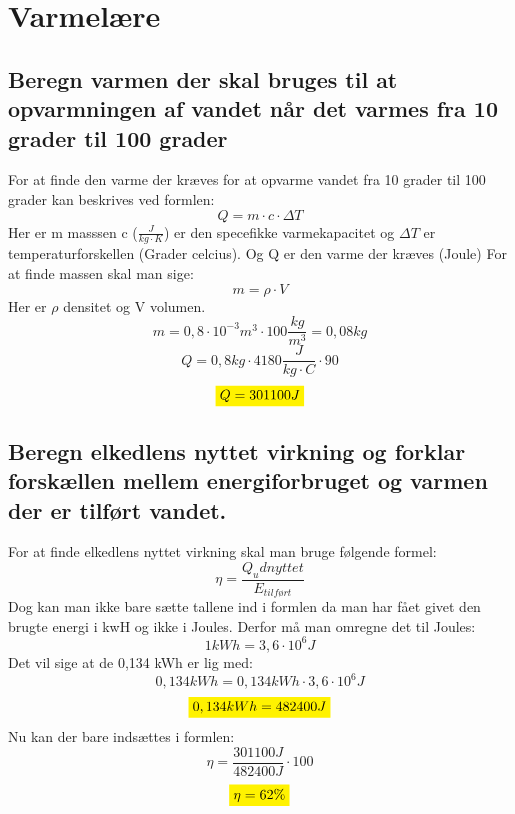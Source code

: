\section{Varmelære}
\subsection{Beregn varmen der skal bruges til at opvarmningen af vandet når det varmes fra 10 grader til 100 grader}
For at finde den varme der kræves for at opvarme vandet fra 10 grader til 100 grader kan beskrives ved formlen: 
\begin{equation*}
    Q=m \cdot c \cdot \Delta T
\end{equation*}
Her er m masssen c (\begin{math}
    \frac{J}{kg \cdot K}
\end{math}) er den specefikke varmekapacitet og $\Delta T$ er temperaturforskellen (Grader celcius). Og Q er den varme der kræves (Joule)
For at finde massen skal man sige: 
\begin{equation*}
    m=\rho \cdot V
\end{equation*}
Her er $\rho$ densitet og V volumen.
\begin{equation*}
    m=0,8 \cdot 10^{-3} m^3  \cdot 100 \frac{kg}{m^3}=0,08 kg
\end{equation*}
\begin{equation*}
    Q=0,8 kg \cdot 4180 \frac{J}{kg \cdot C} \cdot 90
\end{equation*}
\begin{equation*}
    \mathcolorbox{yellow}{Q=301100 J}
\end{equation*}
\subsection{Beregn elkedlens nyttet virkning og forklar forskællen mellem energiforbruget og varmen der er tilført vandet.}
For at finde elkedlens nyttet virkning skal man bruge følgende formel: 
\begin{equation*}
    \eta=\frac{Q_udnyttet}{E_{tilført}}
\end{equation*}
Dog kan man ikke bare sætte tallene ind i formlen da man har fået givet den brugte energi i kwH og ikke i Joules. 
Derfor må man omregne det til Joules:
\begin{equation*}
    1 kWh=3,6 \cdot 10^6 J
\end{equation*}
Det vil sige at de 0,134 kWh er lig med:
\begin{equation*}
    0,134 kWh=0,134 kWh \cdot 3,6 \cdot 10^6 J
\end{equation*}
\begin{equation*}
    \mathcolorbox{yellow}{0,134 kWh=482400 J}
\end{equation*}
Nu kan der bare indsættes i formlen:
\begin{equation*}
    \eta=\frac{301100 J}{482400 J}\cdot 100
\end{equation*}
\begin{equation*}
    \mathcolorbox{yellow}{\eta=62\%}
\end{equation*}

